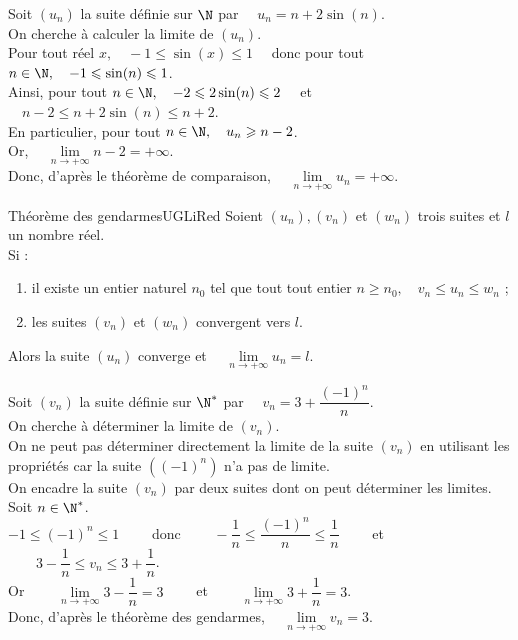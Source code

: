 \documentclass[a4paper,11pt,cours]{nsi} %
\begin{document}
\begin{exemple}[ d'application]
    Soit $(u_n)$ la suite définie sur $\N$ par $\quad u_n=n+2\sin(n)$.\\
    On cherche à calculer la limite de $(u_n)$.\\

    Pour tout réel $x, \quad -1\leqslant \sin(x)\leqslant 1\quad$ donc pour tout $n\in\N, \quad -1\leqslant \sin(n)\leqslant 1$.\\[.5em]
    Ainsi, pour tout $n\in\N, \quad -2\leqslant 2\sin(n)\leqslant 2\quad$ et $\quad n-2\leqslant n+2\sin(n)\leqslant n+2$.\\[.5em]
    En particulier, pour tout $n\in\N, \quad u_n\geqslant n-2$.\\[.5em]
    Or, $\quad \lim\limits_{n\to+\infty} n-2 =+\infty$.\\[.5em]
    Donc, d'après le théorème de comparaison, $\quad \lim\limits_{n\to+\infty} u_n =+\infty$.
\end{exemple}



\begin{encadrecolore}{Théorème des gendarmes}{UGLiRed}
    Soient $(u_n), (v_n)$ et $(w_n)$ trois suites et $l$ un nombre réel.\\[.5em]
    Si :
    \begin{enumerate}[label=\textbullet]
        \item il existe un entier naturel $n_0$ tel que tout tout entier $n\geqslant n_0, \quad v_n\leqslant u_n \leqslant w_n$ ;
        \item les suites $(v_n)$ et $(w_n)$ convergent vers $l$.
    \end{enumerate}
    Alors la suite $(u_n)$ converge et $\quad \lim\limits_{n\to+\infty}u_n=l$.
\end{encadrecolore}

\begin{exemple}[ d'utilisation]
    Soit $(v_n)$ la suite définie sur $\N^*$ par $\quad v_n=3+\dfrac{(-1)^n}{n}$.\\
    On cherche à déterminer la limite de $(v_n)$.\\

    On ne peut pas déterminer directement la limite de la suite $(v_n)$ en utilisant les propriétés car la suite $\left((-1)^n\right)$ n'a pas de limite.\\
    \faLightbulb \hspace*{.3cm} On encadre la suite $(v_n)$ par deux suites dont on peut déterminer les limites.\\

    Soit $n\in\N^*$.\\
    $-1\leqslant (-1)^n \leqslant 1 \qquad$ donc $\qquad -\dfrac{1}{n} \leqslant \dfrac{(-1)^n}{n} \leqslant \dfrac{1}{n} \qquad$ et $\qquad 3-\dfrac{1}{n} \leqslant v_n \leqslant 3+\dfrac{1}{n}$.\\[.5em]
    Or $\qquad \lim\limits_{n\to+\infty} 3-\dfrac{1}{n}=3\qquad$ et $\qquad \lim\limits_{n\to+\infty} 3+\dfrac{1}{n}=3$.\\[.5em]
    Donc, d'après le théorème des gendarmes, $\quad \lim\limits_{n\to+\infty} v_n=3$.
\end{exemple}
\end{document}
